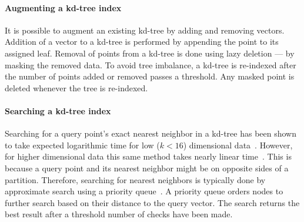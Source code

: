             \paragraph{Augmenting a kd-tree index}
            It is possible to augment an existing kd-tree by adding and
              removing vectors.
            Addition of a vector to a kd-tree is performed by appending
              the point to its assigned leaf.
            Removal of points from a kd-tree is done using lazy
              deletion --- \ie{} by masking the removed data.
            To avoid tree imbalance, a kd-tree is re-indexed after the
              number of points added or removed passes a threshold.
            Any masked point is deleted whenever the tree is
              re-indexed.

            \paragraph{Searching a kd-tree index}
            Searching for a query point's exact nearest neighbor in a
              kd-tree has been shown to take expected logarithmic time
              for low ($k < 16$) dimensional
              data~\cite{friedman_algorithm_1977}.
            However, for higher dimensional data this same method takes
              nearly linear time~\cite{sproull_refinements_1991}.
            This is because a query point and its nearest neighbor
              might be on opposite sides of a partition.
            Therefore, searching for nearest neighbors is typically
              done by approximate search using a priority
              queue~\cite{beis_shape_1997}.
            A priority queue orders nodes to further search based on
              their distance to the query vector. %
            The search returns the best result after a threshold number
              of checks have been made.

